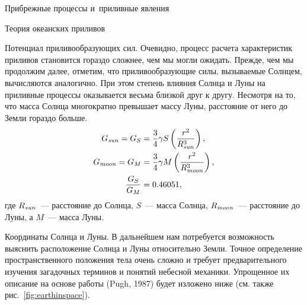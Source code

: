 \begin{chapter}{Прибрежные процессы и~приливные явления}
\begin{section}{Теория океанских приливов}
\begin{paragraph}{Потенциал приливообразующих сил.}
Очевидно, процесс расчета характеристик приливов становится гораздо
сложнее, чем мы могли ожидать. Прежде, чем мы продолжим далее, отметим, что
приливообразующие силы, вызываемые Солнцем, вычисляются аналогично.
При этом степень влияния Солнца и Луны на приливные процессы оказывается
весьма близкой друг к другу. Несмотря на то, что масса Солнца многократно 
превышает массу Луны, расстояние от него до Земли гораздо больше.
\begin{align}
 G_{\text{\textit{sun}}}     = G_{S} &= \frac{3}{4} \gamma S \left( \frac{r^{2}}{R_{\text{\textit{sun}}}^{3}} \right), \\
 G_{\text{\textit{moon}}}    = G_{M} &= \frac{3}{4} \gamma M \left( \frac{r^{2}}{R_{\text{\textit{moon}}}^{3}} \right), \\
\frac{G_{S}}{G_{M}} &= 0.46051,
\end{align}
где $R_{\text{\textit{sun}}}$~--- расстояние до Солнца, $S$~--- масса Солнца,
$R_{\text{\textit{moon}}}$~--- расстояние до Луны, а $M$~--- масса Луны.
%
\end{paragraph}

\begin{paragraph}{Координаты Солнца и Луны.}
В дальнейшем нам потребуется
возможность выяснить расположение Солнца и Луны относительно Земли.
Точное определение пространственного положения тела очень сложно и
требует предварительного изучения загадочных терминов и понятий небесной
механики. Упрощенное их описание на основе работы (Pugh, 1987) будет
изложено ниже (см. также рис.~\ref{fig:earthinspace}).
%


\end{paragraph}
\end{section}
\end{chapter}
